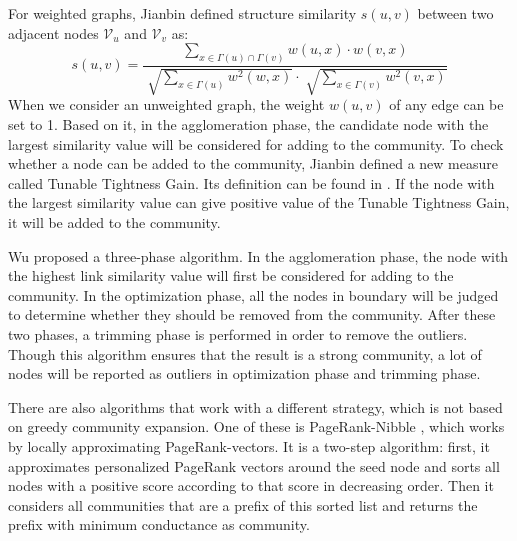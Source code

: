\documentclass[\main/thesis.tex]{subfiles}
\begin{document}
For weighted graphs, Jianbin \cite{huang2011towards} defined structure similarity $s(u,v)$ between two adjacent nodes $\mathcal{V}_u$ and $\mathcal{V}_v$ as:
\begin{equation}
s(u,v)=\frac{\sum_{x\in \Gamma(u)\cap\Gamma(v)}w(u,x)\cdot w(v,x)}{\sqrt[]{\sum_{x\in \Gamma(u)}w^2(w,x)}\cdot\sqrt[]{\sum_{x\in \Gamma(v)}w^2(v,x)}}
\end{equation}
When we consider an unweighted graph, the weight $w(u,v)$ of any edge can be set to 1. Based on it, in the agglomeration phase, the candidate node with the largest similarity value will be considered for adding to the community. To check whether a node can be added to the community, Jianbin defined a new measure called Tunable Tightness Gain. Its definition can be found in \cite{huang2011towards}. If the node with the largest similarity value can give positive value of the Tunable Tightness Gain, it will be added to the community.

Wu \cite{wu2012local} proposed a three-phase algorithm. In the agglomeration phase, the node with the highest link similarity value will first be considered for adding to the community. In the optimization phase, all the nodes in boundary will be judged to determine whether they should be removed from the community. After these two phases, a trimming phase is performed in order to remove the outliers. Though this algorithm ensures that the result is a strong community, a lot of nodes will be reported as outliers in optimization phase and trimming phase.

There are also algorithms that work with a different strategy, which is not based on greedy community expansion. One of these is PageRank-Nibble \cite{andersen2006local}, which works by locally approximating PageRank-vectors. It is a two-step algorithm: first, it approximates personalized PageRank vectors around the seed node and sorts all nodes with a positive score according to that score in decreasing order. Then it considers all communities that are a prefix of this sorted list and returns the prefix with minimum conductance as community.
\end{document}
